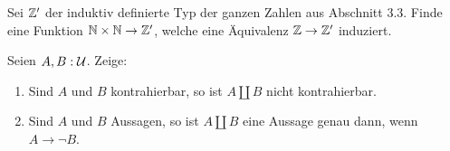 \documentclass{uebung}
\begin{document}

\begin{exercise}
  Sei $\mathbb{Z}'$ der induktiv definierte Typ der ganzen Zahlen aus Abschnitt 3.3.
  Finde eine Funktion $\mathbb{N}\times \mathbb{N}\to\mathbb{Z}'$, welche eine Äquivalenz $\mathbb{Z}\to\mathbb{Z}'$ induziert.
\end{exercise}

\begin{exercise}
  Seien $A,B:\mathcal{U}$.
  Zeige:
  \begin{enumerate}
    \item Sind $A$ und $B$ kontrahierbar, so ist $A \amalg B$ nicht kontrahierbar.
    \item Sind $A$ und $B$ Aussagen, so ist $A \amalg B$ eine Aussage genau dann, wenn $A \to \neg B$.
  \end{enumerate}
\end{exercise}
\end{document}
